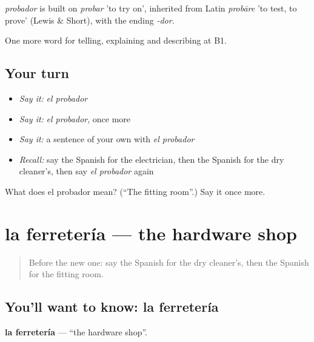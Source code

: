 \begin{cousinweb}
\emph{probador} is built on \emph{probar} 'to try on', inherited from Latin \emph{probāre} 'to test, to prove' (Lewis \& Short), with the ending \emph{-dor}.
\end{cousinweb}

\begin{grammarlens}[title={What you've built}]
One more word for telling, explaining and describing at B1.
\end{grammarlens}

\subsection*{Your turn}
\begin{itemize}
\raggedright
  \item \emph{Say it:} \emph{el probador}
  \item \emph{Say it:} \emph{el probador}, once more
  \item \emph{Say it:} a sentence of your own with \emph{el probador}
  \item \emph{Recall:} say the Spanish for the electrician, then the Spanish for the dry cleaner's, then say \emph{el probador} again
\end{itemize}

\begin{tcolorbox}[breakable,colback=teal!4,colframe=teal!35!black,title={Before you move on}]
What does el probador mean? (\textquotedblleft{}The fitting room\textquotedblright{}.) Say it once more.
\end{tcolorbox}
\section[la ferretería]{la ferretería — the hardware shop}

\label{lesson:ES-C770-ferreteria}



\begin{quote}
Before the new one: say the Spanish for the dry cleaner's, then the Spanish for the fitting room.
\end{quote}

\subsection*{You'll want to know: la ferretería}
\textbf{la ferretería} — \textquotedblleft{}the hardware shop\textquotedblright{}.

